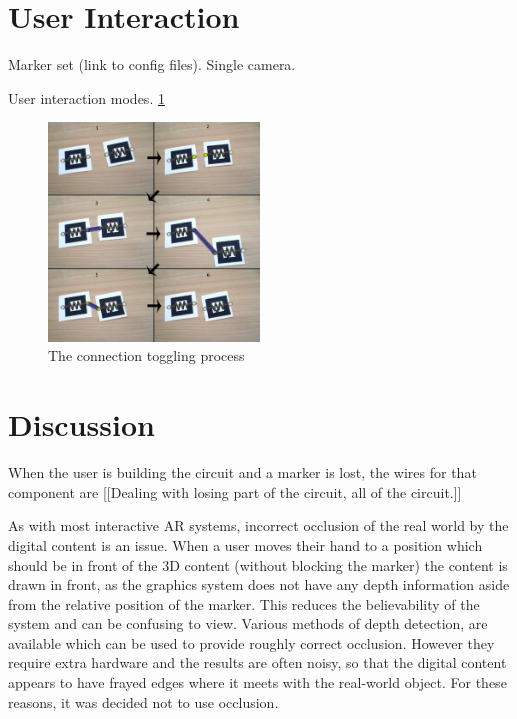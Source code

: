 \section{User Interaction}
Marker set (link to config files).
Single camera.

User interaction modes.
\ref{connection}

\begin{figure}
\begin{center}
\includegraphics[width=0.50\textwidth]{connection}
\end{center}
\caption{The connection toggling process}
\label{connection}
\end{figure}

\section{Discussion}

When the user is building the circuit and a marker is lost, the wires for that component are 
[[Dealing with losing part of the circuit, all of the circuit.]]

As with most interactive AR systems, incorrect occlusion of the real world by the digital content is an issue. When a user moves their hand to a position which should be in front of the 3D content (without blocking the marker) the content is drawn in front, as the graphics system does not have any depth information aside from the relative position of the marker. This reduces the believability of the system and can be confusing to view. Various methods of depth detection, are available which can be used to provide roughly correct occlusion. However they require extra hardware and the results are often noisy, so that the digital content appears to have frayed edges where it meets with the real-world object. For these reasons, it was decided not to use occlusion.

